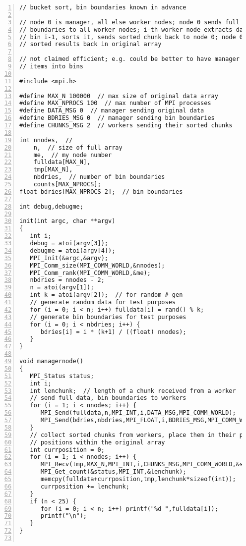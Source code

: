 \begin{lstlisting}[numbers=left]
// bucket sort, bin boundaries known in advance

// node 0 is manager, all else worker nodes; node 0 sends full data, bin
// boundaries to all worker nodes; i-th worker node extracts data for
// bin i-1, sorts it, sends sorted chunk back to node 0; node 0 places
// sorted results back in original array

// not claimed efficient; e.g. could be better to have manager place
// items into bins

#include <mpi.h>

#define MAX_N 100000  // max size of original data array
#define MAX_NPROCS 100  // max number of MPI processes
#define DATA_MSG 0  // manager sending original data
#define BDRIES_MSG 0  // manager sending bin boundaries
#define CHUNKS_MSG 2  // workers sending their sorted chunks

int nnodes,  // 
    n,  // size of full array
    me,  // my node number 
    fulldata[MAX_N],
    tmp[MAX_N],
    nbdries,  // number of bin boundaries
    counts[MAX_NPROCS];
float bdries[MAX_NPROCS-2];  // bin boundaries

int debug,debugme; 

init(int argc, char **argv)
{  
   int i;
   debug = atoi(argv[3]); 
   debugme = atoi(argv[4]); 
   MPI_Init(&argc,&argv);
   MPI_Comm_size(MPI_COMM_WORLD,&nnodes);
   MPI_Comm_rank(MPI_COMM_WORLD,&me); 
   nbdries = nnodes - 2;
   n = atoi(argv[1]); 
   int k = atoi(argv[2]);  // for random # gen
   // generate random data for test purposes
   for (i = 0; i < n; i++) fulldata[i] = rand() % k;
   // generate bin boundaries for test purposes
   for (i = 0; i < nbdries; i++) {
      bdries[i] = i * (k+1) / ((float) nnodes);
   }
}

void managernode()
{  
   MPI_Status status;
   int i;
   int lenchunk;  // length of a chunk received from a worker
   // send full data, bin boundaries to workers
   for (i = 1; i < nnodes; i++) {
      MPI_Send(fulldata,n,MPI_INT,i,DATA_MSG,MPI_COMM_WORLD);
      MPI_Send(bdries,nbdries,MPI_FLOAT,i,BDRIES_MSG,MPI_COMM_WORLD);
   }
   // collect sorted chunks from workers, place them in their proper
   // positions within the original array
   int currposition = 0;
   for (i = 1; i < nnodes; i++) {
      MPI_Recv(tmp,MAX_N,MPI_INT,i,CHUNKS_MSG,MPI_COMM_WORLD,&status);
      MPI_Get_count(&status,MPI_INT,&lenchunk);
      memcpy(fulldata+currposition,tmp,lenchunk*sizeof(int));
      currposition += lenchunk;
   }
   if (n < 25) {
      for (i = 0; i < n; i++) printf("%d ",fulldata[i]);
      printf("\n");
   }
}


\end{lstlisting}
